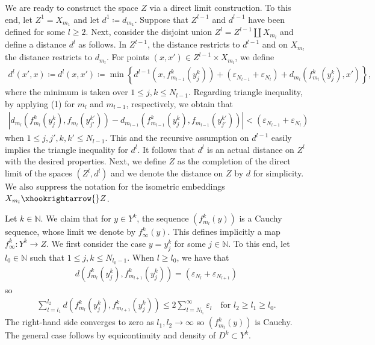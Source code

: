 \documentclass[a4paper,leqno]{amsart}
\numberwithin{equation}{section}
\theoremstyle{remark}
\theoremstyle{remark}
\newcommand{\N}{\mathbb{N}}
\begin{document}
We are ready to construct the space $Z$ via a direct limit construction. To this end, let $Z^1 = X_{m_1}$ and let $d^{1} \coloneqq d_{ m_1 }$. Suppose that $Z^{l-1}$ and $d^{l-1}$ have been defined for some $l \geq 2$. Next, consider the disjoint union $Z^{l} = Z^{l-1} \coprod X_{ m_{l} }$ and define a distance $d^{l}$ as follows. In $Z^{l-1}$, the distance restricts to $d^{l-1}$ and on $X_{m_l}$ the distance restricts to $d_{ m_l }$. For points $(x,x') \in Z^{l-1} \times X_{ m_l }$, we define
\begin{align*}
    d^{l}(x',x)
    \coloneqq
    d^{l}(x,x')
    \coloneqq
    \min\left\{ d^{l-1}(x, f_{m_{l-1}}^{k}( y^{k}_j ) ) + ( \varepsilon_{N_{l-1}} + \varepsilon_{ N_{l} } ) + d_{m_l}( f_{m_{l}}^{k}( y^{k}_j ), x' ) \right\},
\end{align*}
where the minimum is taken over $1 \leq j, k \leq N_{ l-1 }$. Regarding triangle inequality, by applying (1) for $m_{l}$ and $m_{l-1}$, respectively, we obtain that
\begin{align*}
    | d_{m_l}( f_{m_l}^{k}(y^{k}_j), f_{m_l}( y^{k'}_{j'} )) - d_{m_{l-1}}( f_{m_{l-1}}^{k}(y^{k}_j), f_{m_{l-1}}( y^{k'}_{j'} ) ) |
    <
    ( \varepsilon_{N_{l-1}} + \varepsilon_{ N_{l} } )
\end{align*}
when $1 \leq j,j',k, k' \leq N_{l-1}$. This and the recursive assumption on $d^{l-1}$ easily implies the triangle inequality for $d^{l}$. It follows that $d^l$ is an actual distance on $Z^l$ with the desired properties. Next, we define $Z$ as the completion of the direct limit of the spaces $( Z^{l}, d^{l} )$ and we denote the distance on $Z$ by $d$ for simplicity. We also suppress the notation for the isometric embeddings $X_{ m_l } \xhookrightarrow{} Z$.

Let $k \in \mathbb{N}$. We claim that for $y \in Y^k$, the sequence $( f_{m_l}^k(y) )$ is a Cauchy sequence, whose limit we denote by $f_\infty^{k}(y)$. This defines implicitly a map $f_\infty^k \colon Y^k \to Z$. We first consider the case $y = y_{j}^k$ for some $j \in \N$. To this end, let $l_0 \in \mathbb{N}$ such that $1 \leq j, k \leq N_{l_0-1}$. When $l \geq l_0$, we have that
\begin{align*}
    d( f_{ m_l }^{k}( y_{j}^{k} ), f_{ m_{l+1} }^{k}( y_{j}^{k} ) )
    =
    ( \varepsilon_{N_{l}} + \varepsilon_{ N_{l+1} } )
\end{align*}
so
\begin{align*}
    \sum_{ l = l_{1} }^{ l_{2} } d( f_{ m_l }^{k}( y_{j}^{k} ), f_{ m_{l+1} }^{k}( y_{j}^{k} ) )
    \leq
    2
    \sum_{ l = N_{ l_1 } }^{ \infty } \varepsilon_{ l }
    \quad\text{for $l_2 \geq l_1 \geq l_0$}.
\end{align*}
The right-hand side converges to zero as $l_1,l_2 \rightarrow \infty$ so $( f_{m_l}^k(y) )$ is Cauchy. The general case follows by equicontinuity and density of $D^{k} \subset Y^k$.
\end{document}

